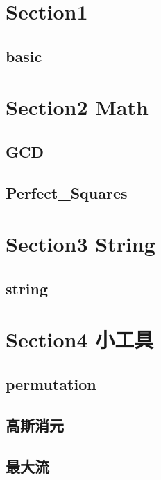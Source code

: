 \section{Section1}
    \subsection{basic}
        
        
\section{Section2 Math}
    \subsection{GCD}
            
    \subsection{Perfect_Squares}
            

\section{Section3 String}
    \subsection{string}
        

\section{Section4 小工具}
    \subsection{permutation}
        
    \subsection{高斯消元}
        
    \subsection{最大流}
        

